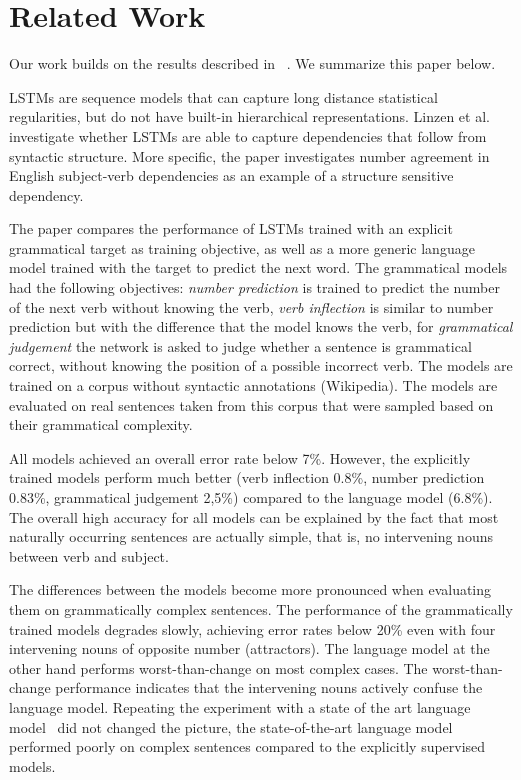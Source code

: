 \section{Related Work}
\label{related work}

Our work builds on the results described in ~\citep{Linzen2016}.  
We summarize this paper below.

LSTMs are sequence models that can capture long distance statistical regularities,
but do not have built-in hierarchical representations.
Linzen et al. investigate whether LSTMs are able to capture
dependencies that follow from syntactic structure. More specific,
the paper investigates number agreement in English subject-verb dependencies
as an example of a structure sensitive dependency.

The paper compares the performance of LSTMs
trained with an explicit grammatical target as training objective,
as well as a more generic language model trained with the target to
predict the next word. 
The grammatical models had the following objectives:
\textit{number prediction} is trained to predict the 
number of the next verb without knowing the verb,
\textit{verb inflection} is similar to number prediction
but with the difference that the model knows the verb,
for \textit{grammatical judgement} the network is asked
to judge whether a sentence is grammatical correct, 
without knowing the position of a possible incorrect
verb.
The models are trained on a corpus without syntactic annotations (Wikipedia).
The models are evaluated on real sentences taken from this corpus
that were sampled based on their grammatical complexity. 
  
All models achieved an overall error rate below 7\%. However,
the explicitly trained models perform much better 
(verb inflection 0.8\%, number prediction 0.83\%, grammatical judgement 2,5\%)
compared to the language model (6.8\%). 
The overall high accuracy for all models can be explained by
the fact that most naturally occurring sentences are actually
simple, that is, no intervening nouns between verb and subject.

The differences between the models become more pronounced
when evaluating them on grammatically complex sentences.
The performance of the grammatically trained models
degrades slowly, achieving error rates below 20\% even with
four intervening nouns of opposite number (attractors).
The language model at the other hand performs worst-than-change
on most complex cases. The worst-than-change performance
indicates that the intervening nouns actively confuse
the language model. Repeating the experiment with a
state of the art language model~\citep{Jozefowicz2016} did not
changed the picture, the state-of-the-art language model 
performed poorly on complex sentences 
compared to the explicitly supervised models.


